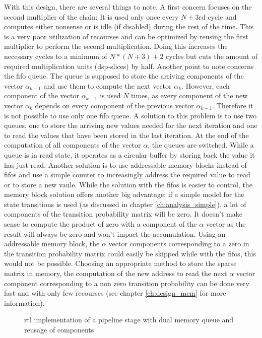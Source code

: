 \documentclass[mscthesis]{usiinfthesis}
\begin{document}
With this design, there are several things to note. A first concern focuses on
the second multiplier of the chain: It is used only once every $N+3$rd cycle
and computes either nonsense or is idle (if disabled) during the rest of the
time. This is a very poor utilization of recourses and can be optimized by
reusing the first multiplier to perform the second multiplication. Doing this
increases the necessary cycles to a minimum of $N*(N+3)+2$ cycles but cuts the
amount of required multiplication units (\gls{dsp}-slices) by half. Another
point to note concerns the \gls{fifo} queue. The queue is supposed to store the
arriving components of the vector $\alpha_{k-1}$ and use them to compute the
next vector $\alpha_k$. However, each component of the vector $\alpha_{k-1}$ is
used $N$ times, as every component of the new vector $\alpha_k$ depends on
every component of the previous vector $\alpha_{k-1}$. Therefore it is not
possible to use only one \gls{fifo} queue. A solution to this problem is to use
two queues, one to store the arriving new values needed for the next iteration
and one to read the values that have been stored in the last iteration. At the
end of the computation of all components of the vector $\alpha$, the queues are
switched. While a queue is in read state, it operates as a circular buffer by
storing back the value it has just read. Another solution is to use addressable
memory blocks instead of \glspl{fifo} and use a simple counter to increasingly
address the required value to read or to store a new vaule. While the solution
with the \glspl{fifo} is easier to control, the memory block solution offers
another big advantage: if a simple model for the state transitions is used (as
discussed in chapter \ref{ch:analysis_simple}), a lot of components of the
transition probability matrix will be zero. It doesn't make sense to compute
the product of zero with a component of the $\alpha$ vector as the result will
always be zero and won't impact the accumulation. Using an addressable memory
block, the $\alpha$ vector components corresponding to a zero in the transition
probability matrix could easily be skipped while with the \glspl{fifo}, this
would not be possible. Choosing an appropriate method to store the sparse
matrix in memory, the computation of the new address to read the next $\alpha$
vector component corresponding to a non zero transition probability can be done
very fast and with only few recourses (see chapter \ref{ch:design_mem} for more
information).

\begin{figure}
    \centering
    
    \caption{\acrshort{rtl} implementation of a pipeline stage with dual memory queue and
        reusage of components}
    \label{fig:arch_step}
\end{figure}
\end{document}
